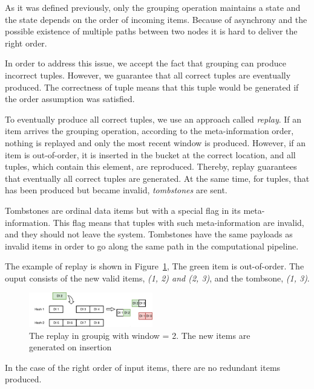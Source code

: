 \label {fs-collision}

As it was defined previously, only the grouping operation maintains a state and the state depends on the order of incoming items. Because of asynchrony and the possible existence of multiple paths between two nodes it is hard to deliver the right order.

In order to address this issue, we accept the fact that grouping can produce incorrect tuples. However, we guarantee that all correct tuples are eventually produced. The correctness of tuple means that this tuple would be generated if the order assumption was satisfied. 

To eventually produce all correct tuples, we use an approach called {\it replay}. If an item arrives the grouping operation, according to the meta-information order, nothing is replayed and only the most recent window is produced. However, if an item is out-of-order, it is inserted in the bucket at the correct location, and all tuples, which contain this element, are reproduced. Thereby, replay guarantees that eventually all correct tuples are generated. At the same time, for tuples, that has been produced but became invalid, {\it tombstones} are sent.

Tombstones are ordinal data items but with a special flag in its meta-information. This flag means that tuples with such meta-information are invalid, and they should not leave the system. Tombstones have the same payloads as invalid items in order to go along the same path in the computational pipeline.

The example of replay is shown in Figure~\ref{grouping-replaying}, The green item is out-of-order. The ouput consists of the new valid items, {\it (1, 2) and (2, 3)}, and the tombsone, {\it (1, 3)}.

\begin{figure}[htbp]
  \centering
  \includegraphics[width=0.48\textwidth]{pics/grouping-replaying}
  \caption{The replay in groupig with window = 2. The new items are generated on insertion}
  \label {grouping-replaying}
\end{figure}

In the case of the right order of input items, there are no redundant items produced.

